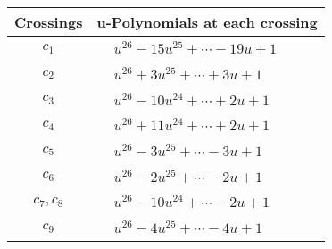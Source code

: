 \documentclass[1p]{elsarticle_modified}
\theoremstyle{definition}
\begin{document}
\begin{tabular}{m{50pt}|m{274pt}}
Crossings & \hspace{64pt}u-Polynomials at each crossing \\
\hline $$\begin{aligned}c_{1}\end{aligned}$$&$\begin{aligned}
&u^{26}-15 u^{25}+\cdots-19 u+1
\end{aligned}$\\
\hline $$\begin{aligned}c_{2}\end{aligned}$$&$\begin{aligned}
&u^{26}+3 u^{25}+\cdots+3 u+1
\end{aligned}$\\
\hline $$\begin{aligned}c_{3}\end{aligned}$$&$\begin{aligned}
&u^{26}-10 u^{24}+\cdots+2 u+1
\end{aligned}$\\
\hline $$\begin{aligned}c_{4}\end{aligned}$$&$\begin{aligned}
&u^{26}+11 u^{24}+\cdots+2 u+1
\end{aligned}$\\
\hline $$\begin{aligned}c_{5}\end{aligned}$$&$\begin{aligned}
&u^{26}-3 u^{25}+\cdots-3 u+1
\end{aligned}$\\
\hline $$\begin{aligned}c_{6}\end{aligned}$$&$\begin{aligned}
&u^{26}-2 u^{25}+\cdots-2 u+1
\end{aligned}$\\
\hline $$\begin{aligned}c_{7},c_{8}\end{aligned}$$&$\begin{aligned}
&u^{26}-10 u^{24}+\cdots-2 u+1
\end{aligned}$\\
\hline $$\begin{aligned}c_{9}\end{aligned}$$&$\begin{aligned}
&u^{26}-4 u^{25}+\cdots-4 u+1
\end{aligned}$\\

\end{tabular}
\end{document}
